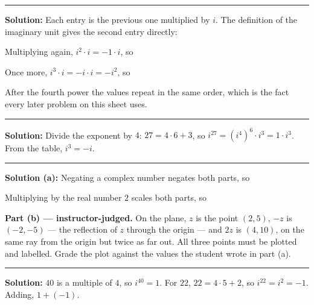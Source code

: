 \documentclass[12pt]{article}
\begin{document}



\vspace{0.3cm}
\noindent\rule{\linewidth}{0.4pt}
\vspace{0.2cm}


\textbf{Solution:} Each entry is the previous one multiplied by $i$. The
definition of the imaginary unit gives the second entry directly: 

Multiplying again, $i^{2} \cdot i = -1 \cdot i$, so 

Once more, $i^{3} \cdot i = -i \cdot i = -i^{2}$, so 

After the fourth power the values repeat in the same order, which is the fact
every later problem on this sheet uses.

\vspace{0.15cm}
\noindent\rule{\linewidth}{0.2pt}


\textbf{Solution:} Divide the exponent by $4$: $27 = 4 \cdot 6 + 3$, so
$i^{27} = (i^{4})^{6} \cdot i^{3} = 1 \cdot i^{3}$. From the table,
$i^{3} = -i$. 

\vspace{0.15cm}
\noindent\rule{\linewidth}{0.2pt}


\textbf{Solution (a):} Negating a complex number negates both parts, so 

Multiplying by the real number $2$ scales both parts, so 

\textbf{Part (b) --- instructor-judged.} On the plane, $z$ is the point
$(2, 5)$, $-z$ is $(-2, -5)$ --- the reflection of $z$ through the origin ---
and $2z$ is $(4, 10)$, on the same ray from the origin but twice as far out.
All three points must be plotted and labelled. Grade the plot against the values
the student wrote in part (a).

\vspace{0.15cm}
\noindent\rule{\linewidth}{0.2pt}


\textbf{Solution:} $40$ is a multiple of $4$, so $i^{40} = 1$. For $22$,
$22 = 4 \cdot 5 + 2$, so $i^{22} = i^{2} = -1$. Adding, $1 + (-1)$. 
\end{document}
